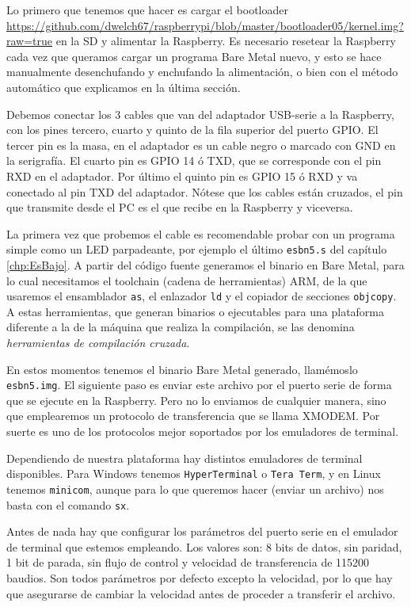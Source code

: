 Lo primero que tenemos que hacer es cargar el bootloader\newline
\textcolor{blue}{
  \href{https://github.com/dwelch67/raspberrypi/blob/master/bootloader05/kernel.img?raw=true}
  {https://github.com/dwelch67/raspberrypi/blob/master/bootloader05/kernel.img?raw=true}}
en la SD y alimentar la Raspberry. Es necesario resetear la Raspberry cada vez que
queramos cargar un programa Bare Metal nuevo, y esto se hace manualmente desenchufando y
enchufando la alimentación, o bien con el método automático que explicamos en la última sección.

Debemos conectar los 3 cables que van del adaptador USB-serie a la Raspberry, con los pines
tercero, cuarto y quinto de la fila superior del puerto GPIO. El tercer pin es la masa, en el
adaptador es un cable negro o marcado con GND en la serigrafía. El cuarto pin es GPIO 14 ó TXD,
que se corresponde con el pin RXD en el adaptador. Por último el quinto pin es GPIO 15 ó RXD y
va conectado al pin TXD del adaptador. Nótese que los cables están cruzados, el pin que
transmite desde el PC es el que recibe en la Raspberry y viceversa.

La primera vez que probemos el cable es recomendable probar con un programa simple como un
LED parpadeante, por ejemplo el último {\tt esbn5.s} del capítulo \ref{chp:EsBajo}. A partir
del código fuente generamos el binario en Bare Metal, para lo cual necesitamos el toolchain
(cadena de herramientas) ARM, de la que usaremos el ensamblador {\tt as}, el enlazador {\tt ld}
y el copiador de secciones {\tt objcopy}. A estas herramientas, que generan binarios
o ejecutables para una plataforma diferente a la de la máquina que realiza la compilación,
se las denomina {\it herramientas de compilación cruzada}.

En estos momentos tenemos el binario Bare Metal generado, llamémoslo {\tt esbn5.img}. El
siguiente paso es enviar este archivo por el puerto serie de forma que se ejecute en la
Raspberry. Pero no lo enviamos de cualquier manera, sino que emplearemos un protocolo
de transferencia que se llama XMODEM. Por suerte es uno de los protocolos mejor soportados
por los emuladores de terminal.

Dependiendo de nuestra plataforma hay distintos emuladores de terminal disponibles. Para
Windows tenemos {\tt HyperTerminal} o {\tt Tera Term}, y en Linux tenemos {\tt minicom},
aunque para lo que queremos hacer (enviar un archivo) nos basta con el comando {\tt sx}.

Antes de nada hay que configurar los parámetros del puerto serie en el emulador de
terminal que estemos empleando. Los valores son: 8 bits de datos, sin paridad, 1 bit de
parada, sin flujo de control y velocidad de transferencia de 115200 baudios. Son todos
parámetros por defecto excepto la velocidad, por lo que hay que asegurarse de cambiar
la velocidad antes de proceder a transferir el archivo.

